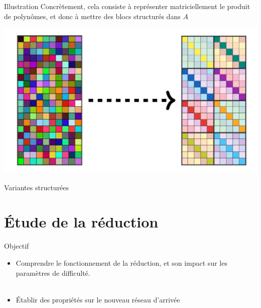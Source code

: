 \documentclass[10 pt, a4paper]{beamer}
\begin{document}
\begin{frame}{Illustration}
Concrètement, cela consiste à représenter matriciellement le produit de polynômes, et donc à mettre des blocs structurés dans $A$
\begin{center}
\includegraphics[scale=0.30]{plwe_struct.png}
\end{center}
\end{frame}


\begin{frame}{Variantes structurées}
\end{frame}


\section{Étude de la réduction}


\begin{frame}{Objectif}
\begin{itemize}
\item<1->[•] Comprendre le fonctionnement de la réduction, et son impact sur les paramètres de difficulté.  \\ ~ \\
\item<2->[•] Établir des propriétés sur le nouveau réseau d'arrivée 
\end{itemize}
\end{frame}
\end{document}
